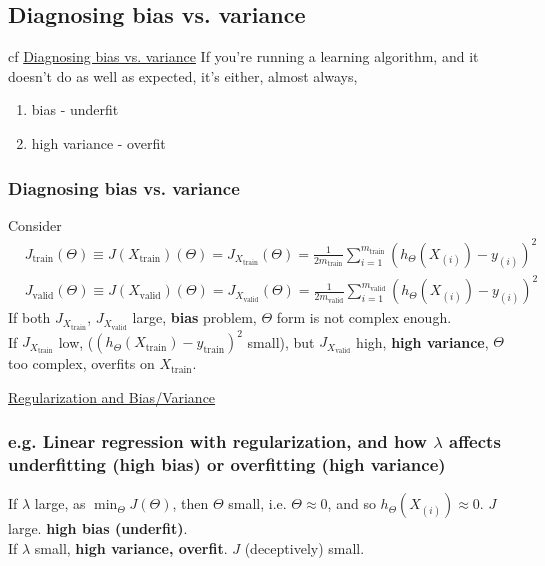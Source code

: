 \documentclass[10pt]{amsart}
\begin{document}
\begin{multicols*}{2}
\subsection{Diagnosing bias vs. variance}

cf \href{https://www.coursera.org/learn/machine-learning/lecture/yCAup/diagnosing-bias-vs-variance}{Diagnosing bias vs. variance}  If you're running a learning algorithm, and it doesn't do as well as expected, it's either, almost always,
\begin{enumerate}
\item bias - underfit
\item high variance - overfit
\end{enumerate}

\subsubsection{Diagnosing bias vs. variance}

Consider 
\[
\begin{aligned}
	& J_{\text{train}}(\Theta) \equiv  J(X_{\text{train}})(\Theta) = J_{X_{\text{train}}}(\Theta) = \frac{1}{2m_{\text{train}}} \sum_{i=1}^{m_{\text{train}} } (h_{\Theta}(X_{(i)}) -y_{(i)} )^2 \\ 
	& J_{\text{valid}}(\Theta) \equiv  J(X_{\text{valid}})(\Theta) = J_{X_{\text{valid}}}(\Theta) = \frac{1}{2m_{\text{valid}}} \sum_{i=1}^{m_{\text{valid}} } (h_{\Theta}(X_{(i)}) -y_{(i)} )^2 
\end{aligned}
\]
If both $J_{X_{\text{train}}}$, $J_{X_{\text{valid}}}$ large, \textbf{bias} problem, $\Theta$ form is not complex enough.  \\
If $J_{X_{\text{train}}}$ low, ($(h_{\Theta}(X_{\text{train}}) -y_{\text{train}})^2$ small), but $J_{X_{\text{valid}}}$ high, \textbf{high variance}, $\Theta$ too complex, overfits on $X_{\text{train}}$.  

\href{https://www.coursera.org/learn/machine-learning/lecture/4VDlf/regularization-and-bias-variance}{Regularization and Bias/Variance}  

\subsubsection{e.g. Linear regression with regularization, and how $\lambda$ affects underfitting (high bias) or overfitting (high variance)}

If $\lambda$ large, as $\min_{\Theta} J(\Theta)$, then $\Theta$ small, i.e. $\Theta \approx 0$, and so $h_{\Theta}(X_{(i)}) \approx 0$.  $J$ large.  \textbf{high bias (underfit)}.  \\
If $\lambda$ small, \textbf{high variance, overfit}.  $J$ (deceptively) small.  


\end{multicols*}
\end{document}
